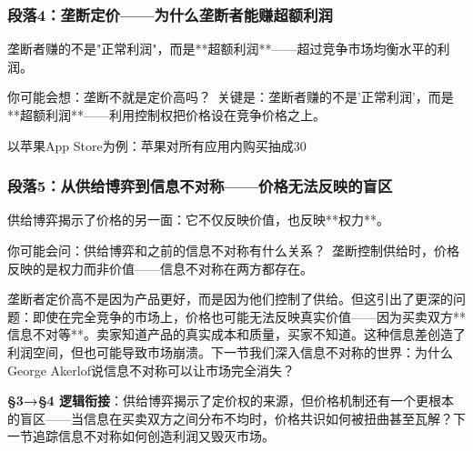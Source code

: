 \documentclass[a4paper,12pt]{book}
\begin{document}
	\subsubsection*{段落4：垄断定价——为什么垄断者能赚超额利润}
	垄断者赚的不是"正常利润"，而是**超额利润**——超过竞争市场均衡水平的利润。
	\begin{tcolorbox}[colback=yellow!5, title=\textit{读者行为预测}]
		你可能会想：垄断不就是定价高吗？\ 关键是：垄断者赚的不是'正常利润'，而是**超额利润**——利用控制权把价格设在竞争价格之上。
	\end{tcolorbox}

以苹果App Store为例：苹果对所有应用内购买抽成30%

	\subsubsection*{段落5：从供给博弈到信息不对称——价格无法反映的盲区}
	供给博弈揭示了价格的另一面：它不仅反映价值，也反映**权力**。
	\begin{tcolorbox}[colback=yellow!5, title=\textit{读者行为预测}]
		你可能会问：供给博弈和之前的信息不对称有什么关系？\ 垄断控制供给时，价格反映的是权力而非价值——信息不对称在两方都存在。
	\end{tcolorbox}

垄断者定价高不是因为产品更好，而是因为他们控制了供给。但这引出了更深的问题：即使在完全竞争的市场上，价格也可能无法反映真实价值——因为买卖双方**信息不对等**。卖家知道产品的真实成本和质量，买家不知道。这种信息差创造了利润空间，但也可能导致市场崩溃。下一节我们深入信息不对称的世界：为什么George Akerlof说信息不对称可以让市场完全消失？

	\textbf{§3→§4 逻辑衔接}：供给博弈揭示了定价权的来源，但价格机制还有一个更根本的盲区——当信息在买卖双方之间分布不均时，价格共识如何被扭曲甚至瓦解？下一节追踪信息不对称如何创造利润又毁灭市场。


	
\end{document}

